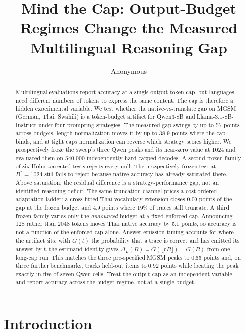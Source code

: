 \documentclass[11pt]{article}
\title{Mind the Cap: Output-Budget Regimes Change the Measured Multilingual Reasoning Gap}
\author{Anonymous}
\begin{document}
\maketitle

\begin{abstract}
Multilingual evaluations report accuracy at a single output-token cap, but languages need different numbers of tokens to express the same content. The cap is therefore a hidden experimental variable. We test whether the native-vs-translate gap on MGSM (German, Thai, Swahili) is a token-budget artifact for Qwen3-8B and Llama-3.1-8B-Instruct under four prompting strategies. The measured gap swings by up to 57 points across budgets, length normalization moves it by up to 38.9 points where the cap binds, and at tight caps normalization can reverse which strategy scores higher. We prospectively froze the sweep's three Qwen peaks and its near-zero value at 1024 and evaluated them on 540,000 independently hard-capped decodes. A second frozen family of six Holm-corrected tests rejects every null. The prospectively frozen test at \(B^*=1024\) still fails to reject because native accuracy has already saturated there. Above saturation, the residual difference is a strategy-performance gap, not an identified reasoning deficit. The same truncation channel prices a cost-ordered adaptation ladder: a cross-fitted Thai vocabulary extension closes 0.00 points of the gap at the frozen budget and 4.9 points where 19\% of traces still truncate. A third frozen family varies only the \emph{announced} budget at a fixed enforced cap. Announcing 128 rather than 2048 tokens moves Thai native accuracy by 5.1 points, so accuracy is not a function of the enforced cap alone. Answer-emission timing accounts for where the artifact sits: with \(G(t)\) the probability that a trace is correct and has emitted its answer by \(t\), the estimand identity gives \(\Delta_L(B)=G(\lfloor rB\rfloor)-G(B)\) from one long-cap run. This matches the three pre-specified MGSM peaks to 0.65 points and, on three further benchmarks, tracks held-out items to 0.92 points while locating the peak exactly in five of seven Qwen cells. Treat the output cap as an independent variable and report accuracy across the budget regime, not at a single budget.
\end{abstract}

\section{Introduction}
\end{document}
